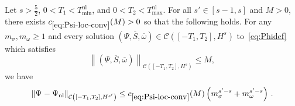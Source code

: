 \documentclass[10pt]{amsart}
\theoremstyle{definition}\newtheorem{defi}[theo]{Definition}\newtheorem{rema}[theo]{Remark}\newtheorem{exam}[theo]{Example}\newtheorem{exem}[theo]{Example}\newtheorem{nota}[theo]{Notation}
\newcommand{\nl}{\mathrm{nl}}
\newcommand{\cC}{\mathcal{C}}
\begin{document}
\begin{prop}\label{prop.conv}
Let $s>\tfrac52$, $0<T_1<T_{\min}^{\nl}$, and $0<T_2<T_{\max}^{\nl}$. For all $s'\in[s-1,s]$ and $M>0$, there exists $c_{\eqref{eq:Psi-loc-conv}}(M)>0$ so that the following holds. For any $m_\sigma, m_\omega\geq 1$ and every solution $(\Psi, \overline{S}, \overline{\omega})\in\cC([-T_1,T_2],H^s)$ to~\eqref{eq:Phidef} which satisfies
\begin{equation*}
\left\|(\Psi, \overline{S}, \overline{\omega})\right\|_{\cC\left([-T_1,T_2],H^s\right)}\leq M,
\end{equation*}
we have
\begin{equation}\label{eq:Psi-loc-conv}
\|\Psi_{{}}-\Psi_{\nl}\|_{\cC\left([-T_1,T_2],H^{s'}\right)}\leq c_{\eqref{eq:Psi-loc-conv}}(M)\left(m_\sigma^{s'-s}+m_{\omega}^{s'-s} \right)\,.
\end{equation}
\end{prop}
\end{document}

